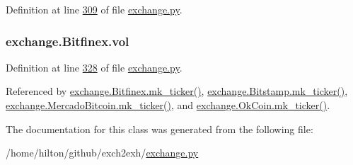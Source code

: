 Definition at line \hyperlink{exchange_8py_source_l00309}{309} of file \hyperlink{exchange_8py_source}{exchange.\+py}.

\subsubsection[{\texorpdfstring{vol}{vol}}]{\setlength{\rightskip}{0pt plus 5cm}exchange.\+Bitfinex.\+vol}\hypertarget{classexchange_1_1_bitfinex_a278da3a9eab93e256041c988f9bbd54c}{}\label{classexchange_1_1_bitfinex_a278da3a9eab93e256041c988f9bbd54c}


Definition at line \hyperlink{exchange_8py_source_l00328}{328} of file \hyperlink{exchange_8py_source}{exchange.\+py}.



Referenced by \hyperlink{exchange_8py_source_l00346}{exchange.\+Bitfinex.\+mk\+\_\+ticker()}, \hyperlink{exchange_8py_source_l00415}{exchange.\+Bitstamp.\+mk\+\_\+ticker()}, \hyperlink{exchange_8py_source_l00549}{exchange.\+Mercado\+Bitcoin.\+mk\+\_\+ticker()}, and \hyperlink{exchange_8py_source_l00614}{exchange.\+Ok\+Coin.\+mk\+\_\+ticker()}.



The documentation for this class was generated from the following file\+:\begin{DoxyCompactItemize}
\item 
/home/hilton/github/exch2exh/\hyperlink{exchange_8py}{exchange.\+py}\end{DoxyCompactItemize}
